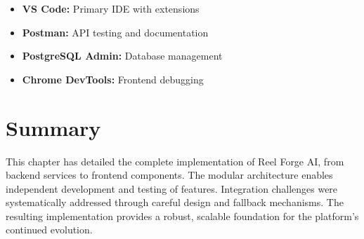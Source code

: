 \begin{itemize}
    \item \textbf{VS Code:} Primary IDE with extensions
    \item \textbf{Postman:} API testing and documentation
    \item \textbf{PostgreSQL Admin:} Database management
    \item \textbf{Chrome DevTools:} Frontend debugging
\end{itemize}

\section{Summary}

This chapter has detailed the complete implementation of Reel Forge AI, from backend services to frontend components. The modular architecture enables independent development and testing of features. Integration challenges were systematically addressed through careful design and fallback mechanisms. The resulting implementation provides a robust, scalable foundation for the platform's continued evolution.
